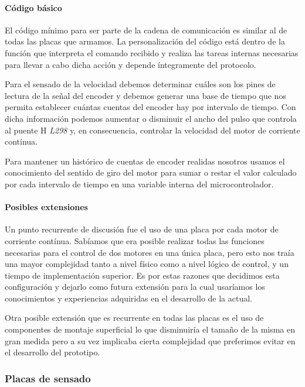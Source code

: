 \paragraph{C\'odigo b\'asico}
\label{h_placas_motorDC_codigo}

El c\'odigo m\'inimo para ser parte de la cadena de comunicaci\'on es similar al de todas las placas que
armamos.
La personalizaci\'on del c\'odigo est\'a dentro de la funci\'on que interpreta el comando recibido y realiza
las tareas internas necesarias para llevar a cabo dicha acci\'on y depende \'integramente del protocolo.

Para el sensado de la velocidad debemos determinar cu\'ales son los pines de lectura de la se\~nal del encoder
y debemos generar una base de tiempo que nos permita establecer cu\'antas cuentas del encoder hay por intervalo
de tiempo.
Con dicha informaci\'on podemos aumentar o disminuir el ancho del pulso que controla al puente H \emph{L298}
y, en consecuencia, controlar la velocidad del motor de corriente cont\'inua.

Para mantener un hist\'orico de cuentas de encoder realidas nosotros usamos el conocimiento del sentido de giro
del motor para sumar o restar el valor calculado por cada intervalo de tiempo en una variable interna del
microcontrolador.

\paragraph{Posibles extensiones}
\label{h_placas_motorDC_extensiones}

Un punto recurrente de discusi\'on fue el uso de una placa por cada motor de corriente cont\'inua.
Sab\'iamos que era posible realizar todas las funciones necesarias para el control de dos motores en una \'unica
placa, pero esto nos tra\'ia una mayor complejidad tanto a nivel f\'isico como a nivel l\'ogico de control, y un
tiempo de implementaci\'on superior.
Es por estas razones que decidimos esta configuraci\'on y dejarlo como futura extensi\'on para la cual usar\'iamos
los conocimientos y experiencias adquiridas en el desarrollo de la actual.

Otra posible extensi\'on que es recurrente en todas las placas es el uso de componentes de montaje superficial
lo que disminuir\'ia el tama\~no de la misma en gran medida pero a su vez implicaba cierta complejidad que preferimos
evitar en el desarrollo del prototipo.

\subsubsection{Placas de sensado}
\label{h_placas_sensado}

